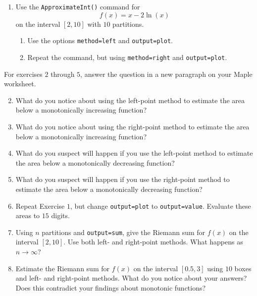 \begin{enumerate}
    \item Use the \texttt{ApproximateInt()} command for \[f(x) = x - 2\ln(x)\] on the interval $[2,10]$ with $10$ partitions.
    \begin{enumerate}
        \item Use the options \texttt{method=left} and \texttt{output=plot}.
        \item Repeat the command, but using \texttt{method=right} and \texttt{output=plot}.
    \end{enumerate}
\end{enumerate}
For exercises $2$ through $5$, answer the question in a new paragraph on your Maple worksheet.
\begin{enumerate}
	\setcounter{enumi}{1}
    \item   What do you notice about using the left-point method to estimate the area below a monotonically increasing function?
    \item   What do you notice about using the right-point method to estimate the area below a monotonically increasing function?
    \item   What do you suspect will happen if you use the left-point method to estimate the area below a monotonically decreasing function?
    \item   What do you suspect will happen if you use the right-point method to estimate the area below a monotonically decreasing function?
    \item   Repeat Exercise $1$, but change \texttt{output=plot} to \texttt{output=value}. Evaluate these areas to $15$ digits.
    \item   Using $n$ partitions and \texttt{output=sum}, give the Riemann sum for $f(x)$ on the interval $[2,10]$. Use both left- and right-point methods.  What happens as $n \rightarrow \infty$?
    \item   Estimate the Riemann sum for $f(x)$ on the interval $[0.5, 3]$ using $10$ boxes and left- and right-point methods.  What do you notice about your answers?  Does this contradict your findings about monotonic functions?
\end{enumerate}

